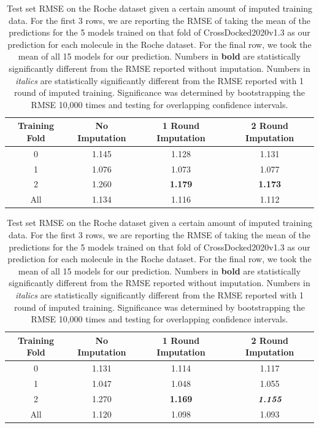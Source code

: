 \documentclass[journal=jcim,manuscript=article]{achemso}
\begin{document}
\begin{table}[]
    \begin{subtable}[h]{0.95\textwidth}
        \centering
        \begin{tabular}{c|c|c|c}
            Training Fold & No Imputation & 1 Round Imputation & 2 Round Imputation \\
            \hline
           0 & 1.145 & 1.128 & 1.131 \\
           1 & 1.076 & 1.073 & 1.077 \\
           2 & 1.260 & \textbf{1.179} & \textbf{1.173} \\
            \hline
            \hline
           All & 1.134 & 1.116 & 1.112 \\
            \hline
        \end{tabular}
    \caption{Performance on gnina docked poses of the Roche dataset.}
    \end{subtable}
    \hfill
    \begin{subtable}[h]{0.95\textwidth}
        \centering
        \begin{tabular}{c|c|c|c}
            Training Fold & No Imputation & 1 Round Imputation & 2 Round Imputation \\
            \hline
           0 & 1.131 & 1.114 & 1.117 \\
           1 & 1.047 & 1.048 & 1.055 \\
           2 & 1.270 & \textbf{1.169} & \textbf{\textit{1.155}} \\
           \hline
           \hline
           All & 1.120 & 1.098 & 1.093 \\
           \hline
           \end{tabular}
       \caption{Performance on the pose provided by the Roche dataset}
    \end{subtable}
    \caption{Test set RMSE on the Roche dataset given a certain amount of imputed training data. For the first 3 rows, we are reporting the RMSE of taking the mean of the predictions for the 5 models trained on that fold of CrossDocked2020v1.3 as our prediction for each molecule in the Roche dataset. For the final row, we took the mean of all 15 models for our prediction. Numbers in \textbf{bold} are statistically significantly different from the RMSE reported without imputation. Numbers in \textit{italics} are statistically significantly different from the RMSE reported with 1 round of imputed training. Significance was determined by bootstrapping the RMSE 10,000 times and testing for overlapping confidence intervals.}
    \label{tab:roche}
\end{table}
\end{document}
